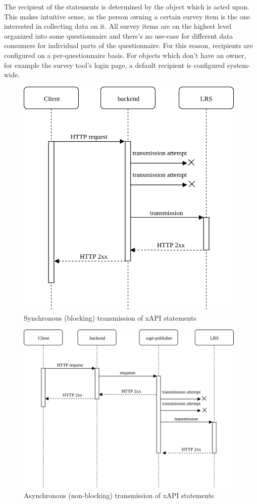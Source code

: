 \documentclass[a4paper,11pt]{article}
\begin{document}
                The recipient of the statements is determined by the object which is acted upon. 
                This makes intuitive sense, as the person owning a certain survey item is the one interested in
                collecting data on it. All survey items are on the highest level
                organized into some questionnaire and there's no use-case for different
                data consumers for individual parts of the questionnaire. 
                For this reason, recipients are configured on a per-questionnaire basis.
                For objects which don't have an owner, for example the survey tool's login
                page, a default recipient is configured system-wide.

                \begin{figure}
                    \centering
                    \includegraphics[width=.48\textwidth]{synchronous-xapi}
                    \caption{Synchronous (blocking) transmission of xAPI statements}
                    \label{fig:synchronous-xapi}
                \end{figure}

                \begin{figure}[H]
                    \centering
                    \includegraphics[width=.8\textwidth]{asynchronous-xapi}
                    \caption{Asynchronous (non-blocking) transmission of xAPI statements}
                    \label{fig:asynchronous-xapi}
                \end{figure}
\end{document}
